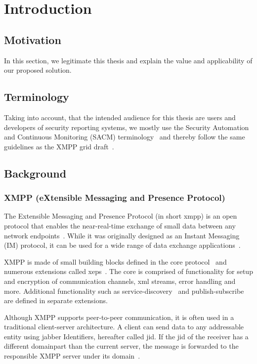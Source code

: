 \newcommand{\code}{\texttt}
\chapter{Introduction}
\label{sec:introduction}

\section{Motivation}
In this section, we legitimate this thesis and explain the value and applicability of our proposed solution.

\section{Terminology}

Taking into account, that the intended audience for this thesis are users and developers of security reporting systems, 
we mostly use the  Security Automation and Continuous Monitoring (SACM) terminology~\cite{ietf-sacm-terminology-14}  and thereby follow the same
guidelines as the XMPP grid draft~\cite{ietf-mile-xmpp-grid-05}.

\section{Background}

\subsection{XMPP (eXtensible Messaging and Presence Protocol)}
The Extensible Messaging and Presence Protocol (in short \gls{xmpp}) is an open protocol that enables the near-real-time exchange of small data between any network endpoints~\cite{rfc6120}.
While it was originally designed as an Instant Messaging (IM) protocol, it can be used for a wide range of data exchange applications~\cite{ieee-xplore-stream-xml-xmpp}.

XMPP is made of small building blocks defined in the core protocol~\cite{rfc6120} and numerous extensions called \glspl{xep}~\cite{xep-0001}.
The core is comprised of functionality for setup and encryption of communication channels, \gls{xml} streams, error handling and more. Additional functionality such as \gls{service-discovery}~\cite{xep-0030} and \gls{publish-subscribe}~\cite{xep-0060} are defined in separate extensions.

Although XMPP supports peer-to-peer communication, it is often used in a traditional client-server architecture.
A client can send data to any addressable entity using \Gls{jabber} Identifiers, hereafter called \gls{jid}. If the \gls{jid} of the receiver has a different domainpart than the current server, the message is forwarded to the responsible XMPP server under its domain~\cite{rfc6120}.

